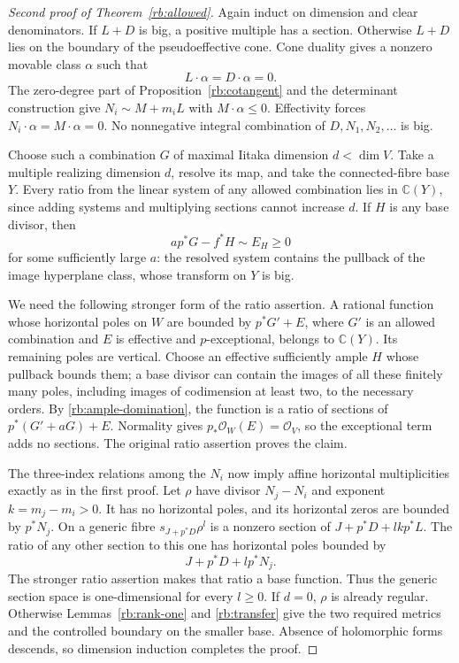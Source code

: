 \begin{proof}[Second proof of Theorem~\ref{rb:allowed}]
Again induct on dimension and clear denominators.  If $L+D$ is big,
a positive multiple has a section.  Otherwise $L+D$ lies on the
boundary of the pseudoeffective cone.  Cone duality gives a nonzero
movable class $\alpha$ such that
\[
                       L\cdot\alpha=D\cdot\alpha=0.
\]
The zero-degree part of Proposition~\ref{rb:cotangent} and the determinant
construction give $N_i\sim M+m_iL$ with $M\cdot\alpha\leq0$.
Effectivity forces $N_i\cdot\alpha=M\cdot\alpha=0$.
No nonnegative integral combination of $D,N_1,N_2,\ldots$ is big.

Choose such a combination $G$ of maximal Iitaka dimension $d<\dim V$.
Take a multiple realizing dimension $d$, resolve its map, and take the
connected-fibre base $Y$.  Every ratio from the linear system of any
allowed combination lies in $\mathbb C(Y)$, since adding systems and
multiplying sections cannot increase $d$.  If $H$ is any base divisor,
then
\begin{equation}\label{rb:ample-domination}
                      ap^*G-f^*H\sim E_H\geq0
\end{equation}
for some sufficiently large $a$: the resolved system contains the
pullback of the image hyperplane class, whose transform on $Y$ is big.

We need the following stronger form of the ratio assertion.  A rational
function whose horizontal poles on $W$ are bounded by $p^*G'+E$, where
$G'$ is an allowed combination and $E$ is effective and $p$-exceptional,
belongs to $\mathbb C(Y)$.  Its remaining poles are vertical.  Choose
an effective sufficiently ample $H$ whose pullback bounds them; a
base divisor can contain the images of all these finitely many poles,
including images of codimension at least two, to the necessary orders.
By \eqref{rb:ample-domination}, the function is a ratio of sections of
$p^*(G'+aG)+E$.  Normality gives
$p_*\mathcal O_W(E)=\mathcal O_V$, so the exceptional term adds no
sections.  The original ratio assertion proves the claim.

The three-index relations among the $N_i$ now imply affine horizontal
multiplicities exactly as in the first proof.  Let $\rho$ have divisor
$N_j-N_i$ and exponent $k=m_j-m_i>0$.  It has no horizontal poles,
and its horizontal zeros are bounded by $p^*N_j$.  On a generic fibre
$s_{J+p^*D}\rho^l$ is a nonzero section of
$J+p^*D+lkp^*L$.  The ratio of any other section to this one has
horizontal poles bounded by
\[
                        J+p^*D+l p^*N_j.
\]
The stronger ratio assertion makes that ratio a base function.  Thus
the generic section space is one-dimensional for every $l\geq0$.
If $d=0$, $\rho$ is already regular.  Otherwise
Lemmas~\ref{rb:rank-one} and \ref{rb:transfer} give the two required
metrics and the controlled boundary on the smaller base.  Absence of
holomorphic forms descends, so dimension induction completes the
proof.
\end{proof}

